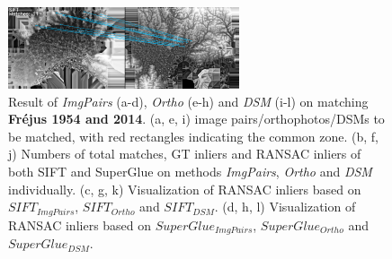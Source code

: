 \begin{figure}[htbp]
\begin{center}
{\begin{minipage}[t]{0.48\linewidth}
                \centering
                \includegraphics[width=6.8cm]{images/Chapitre3/Homol-SIFT2Step-Rough-2DRANSAC_MEC-Malt_Tapas_1954_MEC-Malt_2014.png}
            \end{minipage}%
        }
        \caption{{\scriptsize Result of \textit{ImgPairs} (a-d), \textit{Ortho} (e-h) and \textit{DSM} (i-l) on matching \textbf{Fr{\'e}jus 1954 and 2014}. (a, e, i) image pairs/orthophotos/DSMs to be matched, with red rectangles indicating the common zone. (b, f, j) Numbers of total matches, GT inliers and RANSAC inliers of both SIFT and SuperGlue on methods \textit{ImgPairs}, \textit{Ortho} and \textit{DSM} individually. (c, g, k) Visualization of RANSAC inliers based on $SIFT_{ImgPairs}$, $SIFT_{Ortho}$ and $SIFT_{DSM}$. (d, h, l) Visualization of RANSAC inliers based on $SuperGlue_{ImgPairs}$, $SuperGlue_{Ortho}$ and $SuperGlue_{DSM}$.}}
        \label{MatchVizFrejus1954DSM}
    \end{center}
\end{figure} 



